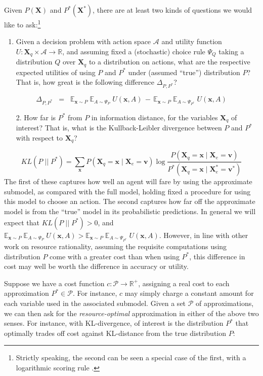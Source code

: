 \documentclass[10pt,letterpaper]{article}
\begin{document}
Given $P(\textbf{X})$ and $P^*(\textbf{X}^*)$, there are at least two kinds of questions we would like to ask:\footnote{Strictly speaking, the second can be seen a special case of the first, with a logarithmic scoring rule \citep{Bernardo}.} \begin{enumerate}
  \item Given a decision problem with action space $\mathcal{A}$ and utility function $U:\textbf{X}_q\times \mathcal{A} \rightarrow\mathbb{R}$, and assuming fixed a (stochastic) choice rule $\Psi_Q$ taking a distribution $Q$ over $\textbf{X}_q$ to a distribution on actions, what are the respective expected utilities of using $P$ and $P^*$ under (assumed ``true'') distribution $P$? That is, how great is the following difference $\Delta_{P,P^*}$? \end{enumerate}
  $$\Delta_{P,P^*} \;\; = \;\; \mathbb{E}_{\textbf{x}\sim P}\;\mathbb{E}_{A \sim \Psi_{P}}\;U(\textbf{x},A) \,-\, \mathbb{E}_{\textbf{x} \sim P}\;\mathbb{E}_{A \sim \Psi_{P^*}}\;U(\textbf{x},A)$$
  \begin{enumerate}
  \item[2.] How far is $P^*$ from $P$ in information distance, for the variables $\textbf{X}_q$ of interest? That is, what is the Kullback-Leibler divergence between $P$ and $P^*$ with respect to $\textbf{X}_q$?
\end{enumerate}$$KL(P \;||\; P^*)  =  \sum_{\textbf{x}} P(\textbf{X}_q = \textbf{x} \mid \textbf{X}_{e} = \textbf{v})\; \mbox{log} \; \frac{P(\textbf{X}_q = \textbf{x} \mid \textbf{X}_{e} = \textbf{v})}{P^*(\textbf{X}_q = \textbf{x} \mid \textbf{X}^*_{e} = \textbf{v}^*)}$$
The first of these captures how well an agent will fare by using the approximate submodel, as compared with the full model, holding fixed a procedure for using this model to choose an action. The second captures how far off the approximate model is from the ``true'' model in its probabilistic predictions. In general we will expect that $KL(P \;||\; P^*) > 0$, and $\mathbb{E}_{\textbf{x}\sim P}\;\mathbb{E}_{A \sim \Psi_{P}}\;U(\textbf{x},A) > \mathbb{E}_{\textbf{x} \sim P}\;\mathbb{E}_{A \sim \Psi_{P^*}}\;U(\textbf{x},A)$. However, in line with other work on resource rationality, assuming the requisite computations using distribution $P$ come with a greater cost than when using $P^*$, this difference in cost may well be worth the difference in accuracy or utility.

Suppose we have a cost function $c: \mathcal{P}\rightarrow\mathbb{R}^+$, assigning a real cost to each approximation $P^* \in \mathcal{P}$. For instance, $c$ may simply charge a constant amount for each variable used in the associated submodel. Given a set $\mathcal{P}$ of approximations, we can then ask for the \emph{resource-optimal} approximation  in either of the above two senses. For instance, with KL-divergence, of interest is the distribution $P^*$ that optimally trades off cost against KL-distance from the true distribution $P$: 
\end{document}
